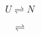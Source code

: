 \documentclass[a4paper,10pt]{article}
\begin{document}
\huge
$$U \rightleftharpoons N$$

$$\rightleftharpoons$$
\end{document}

